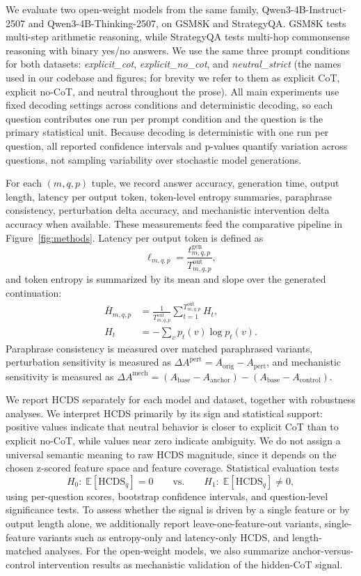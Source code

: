 \documentclass{article}
\theoremstyle{plain}
\theoremstyle{definition}
\theoremstyle{remark}
\begin{document}
We evaluate two open-weight models from the same family, Qwen3-4B-Instruct-2507 and Qwen3-4B-Thinking-2507, on GSM8K and StrategyQA. GSM8K tests multi-step arithmetic reasoning, while StrategyQA tests multi-hop commonsense reasoning with binary yes/no answers. We use the same three prompt conditions for both datasets: \textit{explicit\_cot}, \textit{explicit\_no\_cot}, and \textit{neutral\_strict} (the names used in our codebase and figures; for brevity we refer to them as explicit CoT, explicit no-CoT, and neutral throughout the prose). All main experiments use fixed decoding settings across conditions and deterministic decoding, so each question contributes one run per prompt condition and the question is the primary statistical unit. Because decoding is deterministic with one run per question, all reported confidence intervals and p-values quantify variation across questions, not sampling variability over stochastic model generations.


For each $(m,q,p)$ tuple, we record answer accuracy, generation time, output length, latency per output token, token-level entropy summaries, paraphrase consistency, perturbation delta accuracy, and mechanistic intervention delta accuracy when available. These measurements feed the comparative pipeline in Figure~\ref{fig:methods}. Latency per output token is defined as
\[
\ell_{m,q,p} = \frac{t^{\mathrm{gen}}_{m,q,p}}{T^{\mathrm{out}}_{m,q,p}},
\]
and token entropy is summarized by its mean and slope over the generated continuation:
\[
\begin{aligned}
\bar{H}_{m,q,p}
&=
\frac{1}{T^{\mathrm{out}}_{m,q,p}}
\sum_{t=1}^{T^{\mathrm{out}}_{m,q,p}}
H_t,
\\
H_t
&= -\sum_{v} p_t(v)\log p_t(v).
\end{aligned}
\]
Paraphrase consistency is measured over matched paraphrased variants, perturbation sensitivity is measured as $\Delta A^{\mathrm{pert}} = A_{\mathrm{orig}} - A_{\mathrm{pert}}$, and mechanistic sensitivity is measured as $\Delta A^{\mathrm{mech}} = (A_{\mathrm{base}} - A_{\mathrm{anchor}}) - (A_{\mathrm{base}} - A_{\mathrm{control}})$.

We report HCDS separately for each model and dataset, together with robustness analyses. We interpret HCDS primarily by its sign and statistical support: positive values indicate that neutral behavior is closer to explicit CoT than to explicit no-CoT, while values near zero indicate ambiguity. We do not assign a universal semantic meaning to raw HCDS magnitude, since it depends on the chosen z-scored feature space and feature coverage. Statistical evaluation tests
\[
H_0:\; \mathbb{E}[\mathrm{HCDS}_q] = 0
\qquad \text{vs.} \qquad
H_1:\; \mathbb{E}[\mathrm{HCDS}_q] \neq 0,
\]
using per-question scores, bootstrap confidence intervals, and question-level significance tests. To assess whether the signal is driven by a single feature or by output length alone, we additionally report leave-one-feature-out variants, single-feature variants such as entropy-only and latency-only HCDS, and length-matched analyses. For the open-weight models, we also summarize anchor-versus-control intervention results as mechanistic validation of the hidden-CoT signal.
\end{document}
